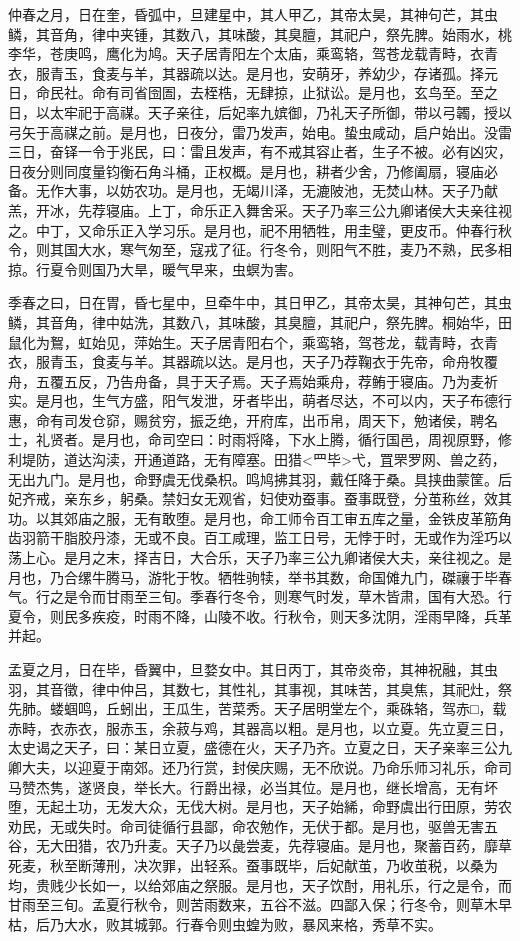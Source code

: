 \documentclass[]{article}
\begin{document}
仲春之月，日在奎，昏弧中，旦建星中，其人甲乙，其帝太昊，其神句芒，其虫鳞，其音角，律中夹锺，其数八，其味酸，其臭膻，其祀户，祭先脾。始雨水，桃李华，苍庚鸣，鹰化为鸠。天子居青阳左个太庙，乘鸾辂，驾苍龙载青畤，衣青衣，服青玉，食麦与羊，其器疏以达。是月也，安萌牙，养幼少，存诸孤。择元日，命民社。命有司省囹圄，去桎梏，无肆掠，止狱讼。是月也，玄鸟至。至之日，以太牢祀于高禖。天子亲往，后妃率九嫔御，乃礼天子所御，带以弓韣，授以弓矢于高禖之前。是月也，日夜分，雷乃发声，始电。蛰虫咸动，启户始出。没雷三日，奋铎一令于兆民，曰：雷且发声，有不戒其容止者，生子不被。必有凶灾，日夜分则同度量钧衡石角斗桶，正权概。是月也，耕者少舍，乃修阖扇，寝庙必备。无作大事，以妨农功。是月也，无竭川泽，无漉陂池，无焚山林。天子乃献羔，开冰，先荐寝庙。上丁，命乐正入舞舍采。天子乃率三公九卿诸侯大夫亲往视之。中丁，又命乐正入学习乐。是月也，祀不用牺牲，用圭璧，更皮币。仲春行秋令，则其国大水，寒气匆至，寇戎了征。行冬令，则阳气不胜，麦乃不熟，民多相掠。行夏令则国乃大旱，暖气早来，虫螟为害。

季春之曰，日在胃，昏七星中，旦牵牛中，其日甲乙，其帝太昊，其神句芒，其虫鳞，其音角，律中姑洗，其数八，其味酸，其臭膻，其祀户，祭先脾。桐始华，田鼠化为鴽，虹始见，萍始生。天子居青阳右个，乘鸾辂，驾苍龙，载青畤，衣青衣，服青玉，食麦与羊。其器疏以达。是月也，天子乃荐鞠衣于先帝，命舟牧覆舟，五覆五反，乃告舟备，具于天子焉。天子焉始乘舟，荐鲔于寝庙。乃为麦祈实。是月也，生气方盛，阳气发泄，牙者毕出，萌者尽达，不可以内，天子布德行惠，命有司发仓窌，赐贫穷，振乏绝，开府库，出币帛，周天下，勉诸侯，聘名士，礼贤者。是月也，命司空曰：时雨将降，下水上腾，循行国邑，周视原野，修利堤防，道达沟渎，开通道路，无有障塞。田猎\textless{}罒毕\textgreater{}弋，罝罘罗网、兽之药，无出九门。是月也，命野虞无伐桑枳。鸣鸠拂其羽，戴任降于桑。具挟曲蒙筐。后妃齐戒，亲东乡，躬桑。禁妇女无观省，妇使劝蚕事。蚕事既登，分茧称丝，效其功。以其郊庙之服，无有敢堕。是月也，命工师令百工审五库之量，金铁皮革筋角齿羽箭干脂胶丹漆，无或不良。百工咸理，监工日号，无悖于时，无或作为淫巧以荡上心。是月之末，择吉日，大合乐，天子乃率三公九卿诸侯大夫，亲往视之。是月也，乃合缧牛腾马，游牝于牧。牺牲驹犊，举书其数，命国傩九门，磔禳于毕春气。行之是令而甘雨至三旬。季春行冬令，则寒气时发，草木皆肃，国有大恐。行夏令，则民多疾疫，时雨不降，山陵不收。行秋令，则天多沈阴，淫雨早降，兵革并起。

孟夏之月，日在毕，昏翼中，旦婺女中。其日丙丁，其帝炎帝，其神祝融，其虫羽，其音徵，律中仲吕，其数七，其性礼，其事视，其味苦，其臭焦，其祀灶，祭先肺。蝼蝈鸣，丘蚓出，王瓜生，苦菜秀。天子居明堂左个，乘硃辂，驾赤□，载赤畤，衣赤衣，服赤玉，余菽与鸡，其器高以粗。是月也，以立夏。先立夏三日，太史谒之天子，曰：某日立夏，盛德在火，天子乃齐。立夏之日，天子亲率三公九卿大夫，以迎夏于南郊。还乃行赏，封侯庆赐，无不欣说。乃命乐师习礼乐，命司马赞杰隽，遂贤良，举长大。行爵出禄，必当其位。是月也，继长增高，无有坏堕，无起土功，无发大众，无伐大树。是月也，天子始絺，命野虞出行田原，劳农劝民，无或失时。命司徒循行县鄙，命农勉作，无伏于都。是月也，驱兽无害五谷，无大田猎，农乃升麦。天子乃以彘尝麦，先荐寝庙。是月也，聚蓄百药，靡草死麦，秋至断薄刑，决次罪，出轻系。蚕事既毕，后妃献茧，乃收茧税，以桑为均，贵贱少长如一，以给郊庙之祭服。是月也，天子饮酎，用礼乐，行之是令，而甘雨至三旬。孟夏行秋令，则苦雨数来，五谷不滋。四鄙入保；行冬令，则草木早枯，后乃大水，败其城郭。行春令则虫蝗为败，暴风来格，秀草不实。
\end{document}
